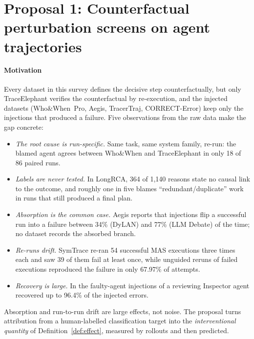 \section{Proposal 1: Counterfactual perturbation screens on agent trajectories}\label{sec:future:perturb}

\paragraph{Motivation} Every dataset in this survey defines the decisive step counterfactually, but only TraceElephant verifies the counterfactual by re-execution, and the injected datasets (Who\&When~Pro, Aegis, TracerTraj, CORRECT-Error) keep only the injections that produced a failure. Five observations from the raw data make the gap concrete:
\begin{itemize}[leftmargin=1.1em]
\item \emph{The root cause is run-specific.} Same task, same system family, re-run: the blamed agent agrees between Who\&When and TraceElephant in only 18 of 86 paired runs.
\item \emph{Labels are never tested.} In LongRCA, 364 of 1,140 reasons state no causal link to the outcome, and roughly one in five blames ``redundant/duplicate'' work in runs that still produced a final plan.
\item \emph{Absorption is the common case.} Aegis reports that injections flip a successful run into a failure between 34\% (DyLAN) and 77\% (LLM Debate) of the time; no dataset records the absorbed branch.
\item \emph{Re-runs drift.} SymTrace \cite{luan2026symtrace} re-ran 54 successful MAS executions three times each and saw 39 of them fail at least once, while unguided reruns of failed executions reproduced the failure in only 67.97\% of attempts.
\item \emph{Recovery is large.} In the faulty-agent injections of \citet{huang2024resilience} a reviewing Inspector agent recovered up to 96.4\% of the injected errors.
\end{itemize}
Absorption and run-to-run drift are large effects, not noise. The proposal turns attribution from a human-labelled classification target into the \emph{interventional quantity} of Definition~\ref{def:effect}, measured by rollouts and then predicted.

